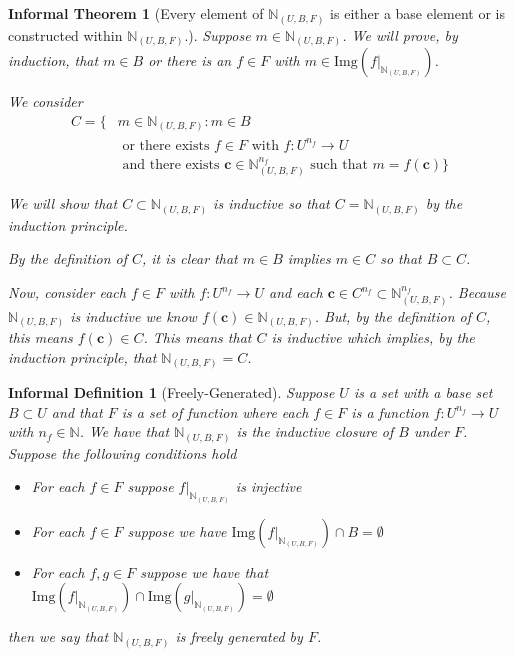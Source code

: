\documentclass[12pt]{article}
\theoremstyle{break}
\theoremstyle{break}
\theoremstyle{break}
\theoremstyle{break}
\theoremstyle{break}
\newtheorem{informal definition}[definition]{Informal Definition}
\theoremstyle{break}
\newtheorem{informal theorem}[theorem]{Informal Theorem}
\newcommand{\bv}[1]{\boldsymbol{#1}}
\newcommand{\natnum}[0]{\mathbb{N}}
\begin{document}
	\begin{informal theorem}[Every element of $\natnum_{(U, B, F)}$ is either a base element or is constructed within $\natnum_{(U, B, F)}$.]
		\label{infthm:allconstructed}
		Suppose $m\in \natnum_{(U, B, F)}$.
		We will prove, by induction, that $m\in B$ or there is an $f\in F$ with $m\in \text{Img}(f|_{\natnum_{(U, B, F)}})$.
		
		We consider
		\begin{align*}
			C = \{&m\in \natnum_{(U, B, F)}: m\in B\\
			&\text{ or there exists } f\in F \text{ with } f: U^{n_f} \to U\\
			&\text{ and there exists } \bv{c}\in \natnum_{(U, B, F)}^{n_f} \text{ such that } m = f(\bv{c})\}
		\end{align*}
		
		We will show that $C\subset \natnum_{(U, B, F)}$ is inductive so that $C = \natnum_{(U, B, F)}$ by the induction principle.
		
		By the definition of $C$, it is clear that $m\in B$ implies $m\in C$ so that $B\subset C$.
		
		Now, consider each $f\in F$ with $f:U^{n_f} \to U$ and each $\bv{c}\in C^{n_f} \subset \natnum_{(U, B, F)}^{n_f}$.
		Because $\natnum_{(U, B, F)}$ is inductive we know $f(\bv{c}) \in \natnum_{(U, B, F)}$.
		But, by the definition of $C$, this means $f(\bv{c}) \in C$.
		This means that $C$ is inductive which implies, by the induction principle, that $\natnum_{(U, B, F)} = C$.
	\end{informal theorem}
	
	\begin{informal definition}[Freely-Generated]
		\label{infdef:freegen}
		Suppose $U$ is a set with a base set $B\subset U$ and that $F$ is a set of function where each $f\in F$ is a function $f:U^{n_f}\to U$ with $n_f \in \natnum$.
		We have that $\natnum_{(U, B, F)}$ is the inductive closure of $B$ under $F$.
		Suppose the following conditions hold
		\begin{itemize}
			\item{For each $f\in F$ suppose $f|_{\natnum_{(U, B, F)}}$ is injective}
			\item{For each $f\in F$ suppose we have $\text{Img}\left(f|_{\natnum_{(U, B, F)}}\right) \cap B = \emptyset$}
			\item{For each $f, g\in F$ suppose we have that $\text{Img}\left(f|_{\natnum_{(U, B, F)}}\right)\cap \text{Img}\left(g|_{\natnum_{(U, B, F)}}\right) = \emptyset$}
		\end{itemize}
		then we say that $\natnum_{(U, B, F)}$ is freely generated by $F$.
	\end{informal definition}
	
\end{document}
